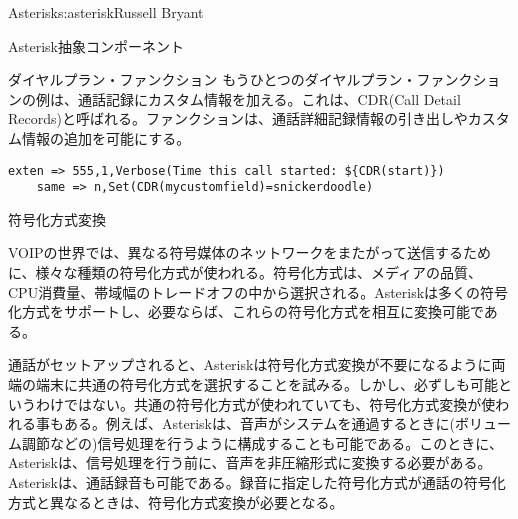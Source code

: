 \begin{aosachapter}{Asterisk}{s:asterisk}{Russell Bryant}
\begin{aosasect1}{Asterisk抽象コンポーネント}
\begin{aosasect2}{ダイヤルプラン・ファンクション}
もうひとつのダイヤルプラン・ファンクションの例は、通話記録にカスタム情報を加える。これは、CDR(Call Detail Records)と呼ばれる。ファンクションは、通話詳細記録情報の引き出しやカスタム情報の追加を可能にする。

\begin{verbatim}
exten => 555,1,Verbose(Time this call started: ${CDR(start)})
    same => n,Set(CDR(mycustomfield)=snickerdoodle)
\end{verbatim}

\end{aosasect2}

\pagebreak

\begin{aosasect2}{符号化方式変換}

VOIPの世界では、異なる符号媒体のネットワークをまたがって送信するために、様々な種類の符号化方式が使われる。符号化方式は、メディアの品質、CPU消費量、帯域幅のトレードオフの中から選択される。Asteriskは多くの符号化方式をサポートし、必要ならば、これらの符号化方式を相互に変換可能である。

通話がセットアップされると、Asteriskは符号化方式変換が不要になるように両端の端末に共通の符号化方式を選択することを試みる。しかし、必ずしも可能というわけではない。共通の符号化方式が使われていても、符号化方式変換が使われる事もある。例えば、Asteriskは、音声がシステムを通過するときに(ボリューム調節などの)信号処理を行うように構成することも可能である。このときに、Asteriskは、信号処理を行う前に、音声を非圧縮形式に変換する必要がある。Asteriskは、通話録音も可能である。録音に指定した符号化方式が通話の符号化方式と異なるときは、符号化方式変換が必要となる。


\end{aosasect2}
\end{aosasect1}
\end{aosachapter}
